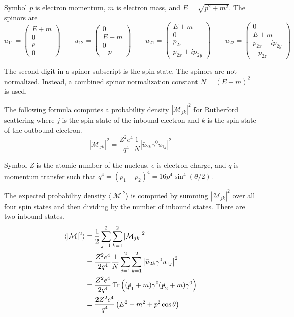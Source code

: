 \documentclass[12pt]{article}
\begin{document}
\noindent
Symbol $p$ is electron momentum, $m$ is electron mass, and $E=\sqrt{p^2+m^2}$.
The spinors are
\begin{equation*}
u_{11}=\begin{pmatrix}E+m\\0\\p\\0\end{pmatrix}
\qquad
u_{12}=\begin{pmatrix}0\\E+m\\0\\-p\end{pmatrix}
\qquad
u_{21}=\begin{pmatrix}E+m\\0\\p_{2z}\\p_{2x}+ip_{2y}\end{pmatrix}
\qquad
u_{22}=\begin{pmatrix}0\\E+m\\p_{2x}-ip_{2y}\\-p_{2z}\end{pmatrix}
\end{equation*}

\noindent
The second digit in a spinor subscript is the spin state.
The spinors are not normalized.
Instead, a combined spinor normalization constant $N=(E+m)^2$ is used.

\bigskip
\noindent
The following formula computes a probability density $|\mathcal{M}_{jk}|^2$ for Rutherford scattering
where $j$ is the spin state of the inbound electron and $k$ is the spin state of the outbound electron.
\begin{equation*}
|\mathcal{M}_{jk}|^2=\frac{Z^2e^4}{q^4}\frac{1}{N}\left|\bar{u}_{2k}\gamma^0 u_{1j}\right|^2
\end{equation*}

\noindent
Symbol $Z$ is the atomic number of the nucleus,
$e$ is electron charge,
and $q$ is momentum transfer such that $q^4=(p_1-p_2)^4=16p^4\sin^4(\theta/2)$.

\bigskip
\noindent
The expected probability density
$\langle\vert\mathcal{M}\vert^2\rangle$
is computed by summing $|\mathcal{M}_{jk}|^2$
over all four spin states and then dividing by the number of inbound states.
There are two inbound states.
\begin{align*}
\langle\vert\mathcal{M}\vert^2\rangle
&=\frac{1}{2}\sum_{j=1}^2\sum_{k=1}^2\left|\mathcal{M}_{jk}\right|^2
\\
&=\frac{Z^2e^4}{2q^4}\frac{1}{N}\sum_{j=1}^2\sum_{k=1}^2\left|\bar{u}_{2k}\gamma^0 u_{1j}\right|^2
\\
&=\frac{Z^2e^4}{2q^4}\mathop{\rm Tr}\left((\slashed{p}_1+m)\gamma^0(\slashed{p}_2+m)\gamma^0\right)
\\
&=\frac{2Z^2e^4}{q^4}\left(E^2+m^2+p^2\cos\theta\right)
\end{align*}
\end{document}
